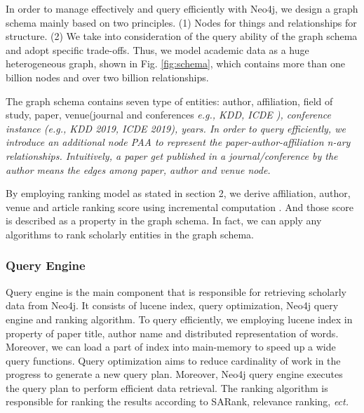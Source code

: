 \par
In order to manage effectively and query efficiently with Neo4j, we design a graph schema mainly based on two principles. (1) Nodes for things and relationships for structure. (2) We take into consideration of the query ability of the graph schema and adopt specific trade-offs. Thus, we model academic data as a huge heterogeneous graph, shown in Fig. \ref{fig:schema}, which contains more than one billion nodes and over two billion relationships.



\par
The graph schema contains seven type of entities: author, affiliation, field of study, paper, venue(journal and conferences \itshape e.g., \upshape KDD, ICDE ), conference instance (\itshape e.g., \upshape KDD 2019, ICDE 2019), years. In order to query efficiently, we introduce an additional node PAA to represent the paper-author-affiliation n-ary relationships. Intuitively, a paper get published in a journal/conference by the author means the edges among paper, author and venue node.

\par
By employing ranking model as stated in section 2, we derive affiliation, author, venue and article ranking score using incremental computation \cite{ma2018query}. And those score is described as a property in the graph schema. In fact, we can apply any algorithms to rank scholarly entities in the graph schema.


\subsubsection{Query Engine}
Query engine is the main component that is responsible for retrieving scholarly data from Neo4j. It consists of lucene index, query optimization, Neo4j query engine and ranking algorithm. To query efficiently, we employing lucene index in property of paper title, author name and distributed representation of words. Moreover, we can load a part of index into main-memory to speed up a wide query functions.
Query optimization aims to reduce cardinality of work in the progress to generate a new query plan. Moreover, Neo4j query engine executes the query plan to perform efficient data retrieval. The ranking algorithm is responsible for ranking the results according to SARank, relevance ranking,  \itshape ect. \upshape


